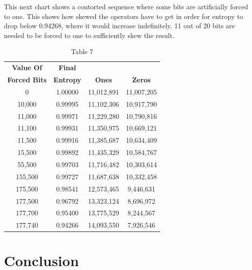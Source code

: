 \documentclass[preprint]{sigplanconf}
\begin{document}
This next chart shows a contorted sequence where some bits are artificially forced to one. This shows how skewed the operators have to get in order for entropy to drop below 0.94268, where it would increase indefinitely. 11 out of 20 bits are needed to be forced to one to sufficiently skew the result.

\begin{table}
    \begin{center}
    \begin{tabular}{|c|c|c|c|}
        \hline
        \textbf{Value Of}    & \textbf{Final}   &               &                \\
        \textbf{Forced Bits} & \textbf{Entropy} & \textbf{Ones} & \textbf{Zeros} \\
        \hline
        0                    & 1.00000          & 11,012,891    & 11,007,205     \\
        10,000               & 0.99995          & 11,102,306    & 10,917,790     \\
        11,000               & 0.99971          & 11,229,280    & 10,790,816     \\
        11,100               & 0.99931          & 11,350,975    & 10,669,121     \\
        11,500               & 0.99916          & 11,385,687    & 10,634,409     \\
        15,500               & 0.99892          & 11,435,329    & 10,584,767     \\
        55,500               & 0.99703          & 11,716,482    & 10,303,614     \\
        155,500              & 0.99727          & 11,687,638    & 10,332,458     \\
        175,500              & 0.98541          & 12,573,465    & 9,446,631      \\
        177,500              & 0.96792          & 13,323,124    & 8,696,972      \\
        177,700              & 0.95400          & 13,775,529    & 8,244,567      \\
        177,740              & 0.94266          & 14,093,550    & 7,926,546      \\
        \hline
    \end{tabular}
    \caption{Table 7}
    \label{tab-7}
\end{center}
\end{table}

\section{Conclusion}
\end{document}
